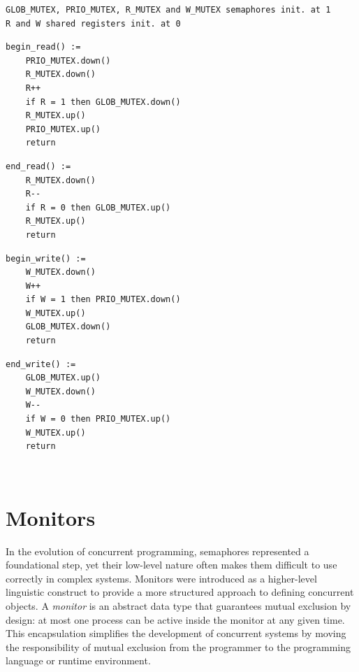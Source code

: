 \begin{itemize}
\begin{minipage}{\textwidth}
\begin{lstlisting}[mathescape]
GLOB_MUTEX, PRIO_MUTEX, R_MUTEX and W_MUTEX semaphores init. at 1
R and W shared registers init. at 0
\end{lstlisting}
\begin{minipage}{0.45\textwidth}
\begin{lstlisting}[mathescape]
begin_read() :=
    PRIO_MUTEX.down()
    R_MUTEX.down()
    R++
    if R = 1 then GLOB_MUTEX.down()
    R_MUTEX.up()
    PRIO_MUTEX.up()
    return
\end{lstlisting}
\end{minipage}
\hfill
\begin{minipage}{0.45\textwidth}
\begin{lstlisting}[mathescape]
end_read() :=
    R_MUTEX.down()
    R--
    if R = 0 then GLOB_MUTEX.up()
    R_MUTEX.up()
    return
\end{lstlisting}
\end{minipage}
\begin{minipage}{0.45\textwidth}
\begin{lstlisting}[mathescape]
begin_write() :=
    W_MUTEX.down()
    W++
    if W = 1 then PRIO_MUTEX.down()
    W_MUTEX.up()
    GLOB_MUTEX.down()
    return
\end{lstlisting}
\end{minipage}
\hfill
\begin{minipage}{0.45\textwidth}
\begin{lstlisting}[mathescape]
end_write() :=
    GLOB_MUTEX.up()
    W_MUTEX.down()
    W--
    if W = 0 then PRIO_MUTEX.up()
    W_MUTEX.up()
    return
\end{lstlisting}
\end{minipage}
\end{minipage}\\

\end{itemize}

\section{Monitors}
In the evolution of concurrent programming, semaphores represented a foundational step, yet their low-level nature often makes them difficult to use correctly in complex systems. Monitors were introduced as a higher-level linguistic construct to provide a more structured approach to defining concurrent objects. A \textit{monitor} is an abstract data type that guarantees mutual exclusion by design: at most one process can be active inside the monitor at any given time. This encapsulation simplifies the development of concurrent systems by moving the responsibility of mutual exclusion from the programmer to the programming language or runtime environment.

